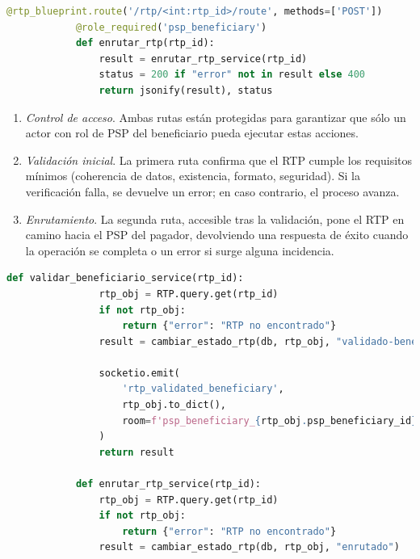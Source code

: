 \begin{itemize}
\begin{lstlisting}[language=Python, style=custom, caption={Endpoints para validación y enrutado}]
            @rtp_blueprint.route('/rtp/<int:rtp_id>/route', methods=['POST'])
            @role_required('psp_beneficiary')
            def enrutar_rtp(rtp_id):
                result = enrutar_rtp_service(rtp_id)
                status = 200 if "error" not in result else 400
                return jsonify(result), status
        \end{lstlisting}

        \begin{enumerate}
          \item \emph{Control de acceso}.  
                Ambas rutas están protegidas para garantizar que sólo un actor
                con rol de PSP del beneficiario pueda ejecutar estas acciones.
          \item \emph{Validación inicial}.  
                La primera ruta confirma que el RTP cumple los requisitos
                mínimos (coherencia de datos, existencia, formato, seguridad).
                Si la verificación falla, se devuelve un error; en caso
                contrario, el proceso avanza.
          \item \emph{Enrutamiento}.  
                La segunda ruta, accesible tras la validación, pone el RTP en
                camino hacia el PSP del pagador, devolviendo una respuesta de
                éxito cuando la operación se completa o un error si surge
                alguna incidencia.
        \end{enumerate}
        \vspace{0.8em}

       \begin{lstlisting}[language=Python, style=custom, caption={Servicio de negocio validación y enrutado}]
            def validar_beneficiario_service(rtp_id):
                rtp_obj = RTP.query.get(rtp_id)
                if not rtp_obj:
                    return {"error": "RTP no encontrado"}
                result = cambiar_estado_rtp(db, rtp_obj, "validado-beneficiario")

                socketio.emit(
                    'rtp_validated_beneficiary',
                    rtp_obj.to_dict(),
                    room=f'psp_beneficiary_{rtp_obj.psp_beneficiary_id}'
                )
                return result

            def enrutar_rtp_service(rtp_id):
                rtp_obj = RTP.query.get(rtp_id)
                if not rtp_obj:
                    return {"error": "RTP no encontrado"}
                result = cambiar_estado_rtp(db, rtp_obj, "enrutado")


\end{lstlisting}
\end{itemize}
